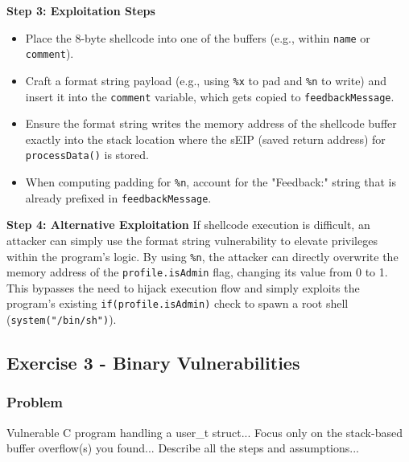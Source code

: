 \documentclass{article}
\begin{document}
\textbf{Step 3: Exploitation Steps}
\begin{itemize}
    \item[\textbf{1.}] Place the 8-byte shellcode into one of the buffers (e.g., within \texttt{name} or \texttt{comment}).
    \item[\textbf{2.}] Craft a format string payload (e.g., using \texttt{\%x} to pad and \texttt{\%n} to write) and insert it into the \texttt{comment} variable, which gets copied to \texttt{feedbackMessage}.
    \item[\textbf{3.}] Ensure the format string writes the memory address of the shellcode buffer exactly into the stack location where the sEIP (saved return address) for \texttt{processData()} is stored.
    \item[\textbf{4.}] When computing padding for \texttt{\%n}, account for the "Feedback:" string that is already prefixed in \texttt{feedbackMessage}.

\end{itemize}
\textbf{Step 4: Alternative Exploitation}
If shellcode execution is difficult, an attacker can simply use the format string vulnerability to elevate privileges within the program's logic. By using \texttt{\%n}, the attacker can directly overwrite the memory address of the \texttt{profile.isAdmin} flag, changing its value from 0 to 1. This bypasses the need to hijack execution flow and simply exploits the program's existing \texttt{if(profile.isAdmin)} check to spawn a root shell (\texttt{system("/bin/sh")}).

\subsection{Exercise 3 - Binary Vulnerabilities}
\subsubsection*{Problem}
Vulnerable C program handling a user\_t struct... Focus only on the stack-based buffer overflow(s) you found... Describe all the steps and assumptions...
\end{document}

